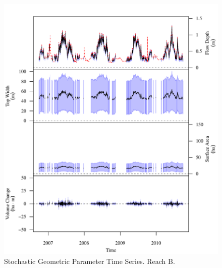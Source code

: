 \begin{figure}[htbp]
\begin{center}
	\includegraphics[width=5.5in]{"Figures/Results_USR/G TS B"}
	\caption{Stochastic Geometric Parameter Time Series.  Reach B.}
\end{center}
\end{figure}
\newpage

